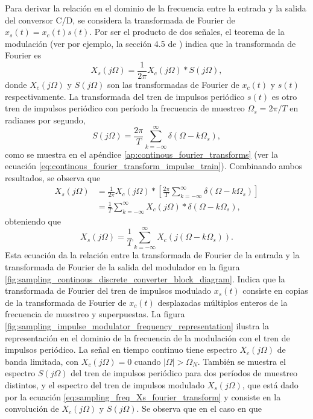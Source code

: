 \documentclass[a4paper]{report}
\begin{document}
Para derivar la relación en el dominio de la frecuencia entre la entrada y la salida del conversor C/D, se considera la transformada de Fourier de \(x_s(t)=x_c(t)s(t)\). Por ser el producto de dos señales, el teorema de la modulación (ver por ejemplo, la sección 4.5 de \cite{oppenheim1997signals}) indica que la transformada de Fourier es 
\[
 X_s(j\Omega)=\frac{1}{2\pi}X_c(j\Omega)*S(j\Omega),
\]
donde \(X_c(j\Omega)\) y \(S(j\Omega)\) son las transformadas de Fourier de \(x_c(t)\) y \(s(t)\) respectivamente. La transformada del tren de impulsos periódico \(s(t)\) es otro tren de impulsos periódico con período la frecuencia de muestreo \(\Omega_s=2\pi/T\) en radianes por segundo,
\[
S(j\Omega)=\frac{2\pi}{T}\sum_{k=-\infty}^{\infty}\delta(\Omega-k\Omega_s),
\]
como se muestra en el apéndice \ref{ap:continous_fourier_transforms} (ver la ecuación \ref{eq:continous_fourier_transform_impulse_train}). Combinando ambos resultados, se observa que
\begin{align*}
X_s(j\Omega)&=\frac{1}{2\pi}X_c(j\Omega)*\left[\frac{2\pi}{T}\sum_{k=-\infty}^{\infty}\delta(\Omega-k\Omega_s)\right]\\
  &=\frac{1}{T}\sum_{k=-\infty}^{\infty}X_c(j\Omega)*\delta(\Omega-k\Omega_s),
\end{align*}
obteniendo que 
\begin{equation}\label{eq:sampling_freq_Xs_fourier_transform}
 X_s(j\Omega)=\frac{1}{T}\sum_{k=-\infty}^{\infty}X_c(j(\Omega-k\Omega_s)). 
\end{equation}
Esta ecuación da la relación entre la transformada de Fourier de la entrada y la transformada de Fourier de la salida del modulador en la figura \ref{fig:sampling_continous_discrete_converter_block_diagram}. Indica que la transformada de Fourier del tren de impulsos modulado \(x_s(t)\) consiste en copias de la transformada de Fourier de \(x_c(t)\) desplazadas múltiplos enteros de la frecuencia de muestreo y superpuestas. La figura \ref{fig:sampling_impulse_modulator_frequency_representation} ilustra la representación en el dominio de la frecuencia de la modulación con el tren de impulsos periódico. La señal en tiempo continuo tiene espectro \(X_c(j\Omega)\) de banda limitada, con \(X_c(j\Omega)=0\) cuando \(|\Omega|>\Omega_N\). También se muestra el espectro \(S(j\Omega)\) del tren de impulsos periódico para dos períodos de muestreo distintos, y el espectro del tren de impulsos modulado \(X_s(j\Omega)\), que está dado por la ecuación \ref{eq:sampling_freq_Xs_fourier_transform} y consiste en la convolución de \(X_c(j\Omega)\) y \(S(j\Omega)\). Se observa que en el caso en que
\end{document}
